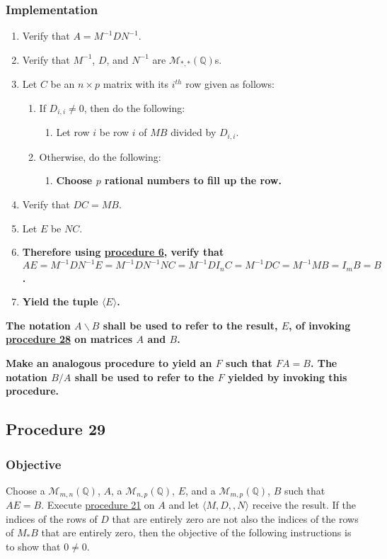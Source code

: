 \documentclass[twocolumn]{article}
\begin{document}
			\subsubsection{Implementation}
				\begin{enumerate}
					\item Verify that $A=M^{-1}DN^{-1}$.
					\item Verify that $M^{-1}$, $D$, and $N^{-1}$ are $\mathcal{M}_{*,*}(\mathbb{Q})$s.
					\item Let $C$ be an $n\times p$ matrix with its $i^{th}$ row given as follows:
					\begin{enumerate}
						\item If $D_{i,i}\ne 0$, then do the following:
						\begin{enumerate}
							\item Let row $i$ be row $i$ of $MB$ divided by $D_{i,i}$.
						\end{enumerate}
						\item Otherwise, do the following:
						\begin{enumerate}
							\item \textbf{Choose $p$ rational numbers to fill up the row.}
						\end{enumerate}
					\end{enumerate}
					\item Verify that $DC=MB$.
					\item Let $E$ be $NC$.
					\item \textbf{Therefore using \hyperref[sec:procedure 6]{procedure 6}, verify that $AE=M^{-1}DN^{-1}E=M^{-1}DN^{-1}NC=M^{-1}DI_nC=M^{-1}DC=M^{-1}MB=I_mB=B$.}
					\item \textbf{Yield the tuple $\langle E\rangle$.}
				\end{enumerate}
			\textbf{The notation $A\backslash B$ shall be used to refer to the result, $E$, of invoking \hyperref[sec:procedure 28]{procedure 28} on matrices $A$ and $B$.}
			
			\textbf{Make an analogous procedure to yield an $F$ such that $FA=B$. The notation $B/A$ shall be used to refer to the $F$ yielded by invoking this procedure.}
		\subsection{Procedure 29}\label{sec:procedure 29}
			\subsubsection{Objective}
				Choose a $\mathcal{M}_{m,n}(\mathbb{Q})$, $A$, a $\mathcal{M}_{n,p}(\mathbb{Q})$, $E$, and a $\mathcal{M}_{m,p}(\mathbb{Q})$, $B$ such that $AE=B$. Execute \hyperref[sec:procedure 21]{procedure 21} on $A$ and let $\langle M,D,,N\rangle$ receive the result. If the indices of the rows of $D$ that are entirely zero are not also the indices of the rows of $M_*B$ that are entirely zero, then the objective of the following instructions is to show that $0\ne 0$.
\end{document}
